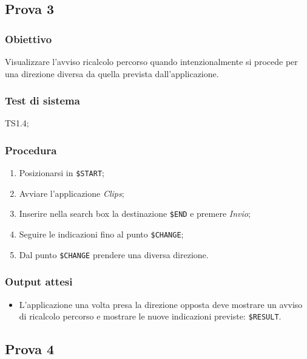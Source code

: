 \documentclass[../SperimentazioniPratiche.tex]{subfiles}
\begin{document}
	
	
\newpage
\subsection{Prova 3} %
\label{subsec:Prova3}
	
	\subsubsection{Obiettivo}
		Visualizzare l'avviso ricalcolo percorso quando intenzionalmente si procede per una direzione diversa da quella prevista dall'applicazione.
		
	\subsubsection{Test di sistema}
		TS1.4;
		
	\subsubsection{Procedura}
		\begin{enumerate}
		\item Posizionarsi in  \verb|$START|;
		\item Avviare l'applicazione \textit{Clips};
		\item Inserire nella search box la destinazione  \verb|$END| e premere \textit{Invio};
		\item Seguire le indicazioni fino al punto  \verb|$CHANGE|;
		\item Dal punto \verb|$CHANGE| prendere una diversa direzione.
		\end{enumerate}
		
	\subsubsection{Output attesi}
		\begin{itemize}
		\item L'applicazione una volta presa la direzione opposta deve mostrare un avviso di ricalcolo percorso e mostrare le nuove indicazioni previste:  \verb|$RESULT|.
		\end{itemize}
		
	
	
\newpage		
\subsection{Prova 4} %
\label{subsec:Prova4}
	
\end{document}
